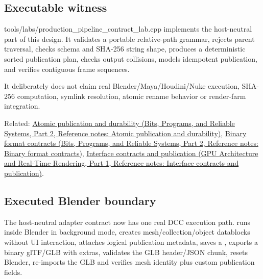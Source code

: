 \subsection{Executable witness}\label{appendix-03ade9e1875f-executable-witness}

\hypertarget{appendix-03ade9e1875f-executable-witness}{}

tools/labs/production\_pipeline\_contract\_lab.cpp implements the host-neutral part of this design. It validates a portable relative-path grammar, rejects parent traversal, checks schema and SHA-256 string shape, produces a deterministic sorted publication plan, checks output collisions, models idempotent publication, and verifies contiguous frame sequences.

It deliberately does not claim real Blender/Maya/Houdini/Nuke execution, SHA-256 computation, symlink resolution, atomic rename behavior or render-farm integration.

Related: \href{../01-Bits-Programs-and-Reliable-Systems-P02/main.pdf\#nameddest=appendix-e89a8f290ef5}{Atomic publication and durability (Bits, Programs, and Reliable Systems, Part 2, Reference notes: Atomic publication and durability)}, \href{../01-Bits-Programs-and-Reliable-Systems-P02/main.pdf\#nameddest=appendix-590bbb2424c1}{Binary format contracts (Bits, Programs, and Reliable Systems, Part 2, Reference notes: Binary format contracts)}, \href{../06-GPU-Architecture-and-Real-Time-Rendering-P01/main.pdf\#nameddest=appendix-fdae7ff0a23f}{Interface contracts and publication (GPU Architecture and Real-Time Rendering, Part 1, Reference notes: Interface contracts and publication)}.

\subsection{Executed Blender boundary}\label{appendix-03ade9e1875f-executed-blender-boundary}

\hypertarget{appendix-03ade9e1875f-executed-blender-boundary}{}

The host-neutral adapter contract now has one real DCC execution path.  runs inside Blender in background mode, creates mesh/collection/object datablocks without UI interaction, attaches logical publication metadata, saves a , exports a binary glTF/GLB with extras, validates the GLB header/JSON chunk, resets Blender, re-imports the GLB and verifies mesh identity plus custom publication fields.

